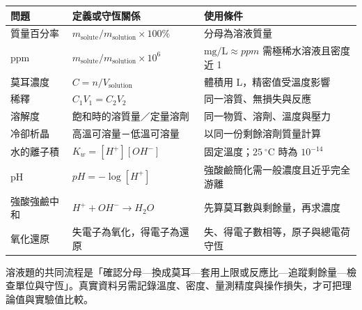 \documentclass[11pt,a4paper]{article}
\newcounter{none}
\begin{document}
{\def\LTcaptype{none} %
\begin{longtable}[]{@{}
  >{\raggedright\arraybackslash}p{}
  >{\raggedright\arraybackslash}p{}
  >{\raggedright\arraybackslash}p{}@{}}
\toprule\noalign{}
\begin{minipage}[b]{\linewidth}\raggedright
問題
\end{minipage} & \begin{minipage}[b]{\linewidth}\raggedright
定義或守恆關係
\end{minipage} & \begin{minipage}[b]{\linewidth}\raggedright
使用條件
\end{minipage} \\
\midrule\noalign{}
\endhead
\bottomrule\noalign{}
\endlastfoot
質量百分率 & \(m_{\mathrm{solute}}/m_{\mathrm{solution}}\times100\%\) & 分母為溶液質量 \\
ppm & \(m_{\mathrm{solute}}/m_{\mathrm{solution}}\times10^6\) & \(\mathrm{mg/L}\approx ppm\) 需極稀水溶液且密度近 1 \\
莫耳濃度 & \(C=n/V_{\mathrm{solution}}\) & 體積用 L，精密值受溫度影響 \\
稀釋 & \(C_1V_1=C_2V_2\) & 同一溶質、無損失與反應 \\
溶解度 & 飽和時的溶質量／定量溶劑 & 同一物質、溶劑、溫度與壓力 \\
冷卻析晶 & 高溫可溶量－低溫可溶量 & 以同一份剩餘溶劑質量計算 \\
水的離子積 & \(K_w=[H^+][OH^-]\) & 固定溫度；\(25\ ^\circ\mathrm C\) 時為 \(10^{-14}\) \\
pH & \(pH=-\log[H^+]\) & 強酸鹼簡化需一般濃度且近乎完全游離 \\
強酸強鹼中和 & \(H^++OH^-\rightarrow H_2O\) & 先算莫耳數與剩餘量，再求濃度 \\
氧化還原 & 失電子為氧化，得電子為還原 & 失、得電子數相等，原子與總電荷守恆 \\
\end{longtable}
}

溶液題的共同流程是「確認分母---換成莫耳---套用上限或反應比---追蹤剩餘量---檢查單位與守恆」。真實資料另需記錄溫度、密度、量測精度與操作損失，才可把理論值與實驗值比較。
\end{document}

